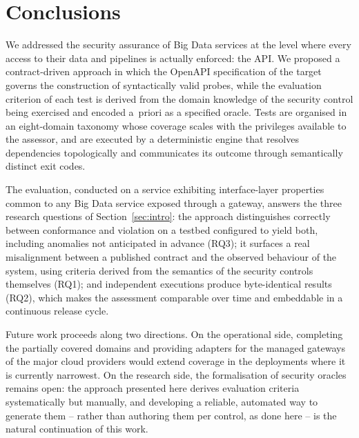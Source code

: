 \section{Conclusions}
\label{sec:conclusions}

We addressed the security assurance of Big Data services at the level where every access to their data and pipelines is actually enforced: the API.
We proposed a contract-driven approach in which the OpenAPI specification of the target governs the construction of syntactically valid probes, while the evaluation criterion of each test is derived from the domain knowledge of the security control being exercised and encoded a~priori as a specified oracle.
Tests are organised in an eight-domain taxonomy whose coverage scales with the privileges available to the assessor, and are executed by a deterministic engine that resolves dependencies topologically and communicates its outcome through semantically distinct exit codes.

The evaluation, conducted on a service exhibiting interface-layer properties common to any Big Data service exposed through a gateway,
answers the three research questions of Section~\ref{sec:intro}: the approach distinguishes correctly between conformance and violation on a testbed configured to yield both, including anomalies not anticipated in advance (RQ3); it surfaces a real misalignment between a published contract and the observed behaviour of the system, using criteria derived from the semantics of the security controls themselves (RQ1); and independent executions produce byte-identical results (RQ2), which makes the assessment comparable over time and embeddable in a continuous release cycle.

Future work proceeds along two directions.
On the operational side, completing the partially covered domains and providing adapters for the managed gateways of the major cloud providers would extend coverage in the deployments where it is currently narrowest.
On the research side, the formalisation of security oracles remains open: the approach presented here derives evaluation criteria systematically but manually, and developing a reliable, automated way to generate them -- rather than authoring them per control, as done here -- is the natural continuation of this work.


